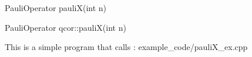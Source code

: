 
\begin{apidefinition}

\begin{Csynopsis}
    PauliOperator pauliX(int n)
\end{Csynopsis}

\begin{Cppsynopsis}
    PauliOperator qcor::pauliX(int n)
\end{Cppsynopsis}


\begin{apiarguments}
\end{apiarguments}



\apinotes{
    
}

\begin{apiexamples}

\apicppexample
    { This is a simple program that calls : } 
    { example_code/pauliX_ex.cpp} 
    {}

\end{apiexamples}

\end{apidefinition}
